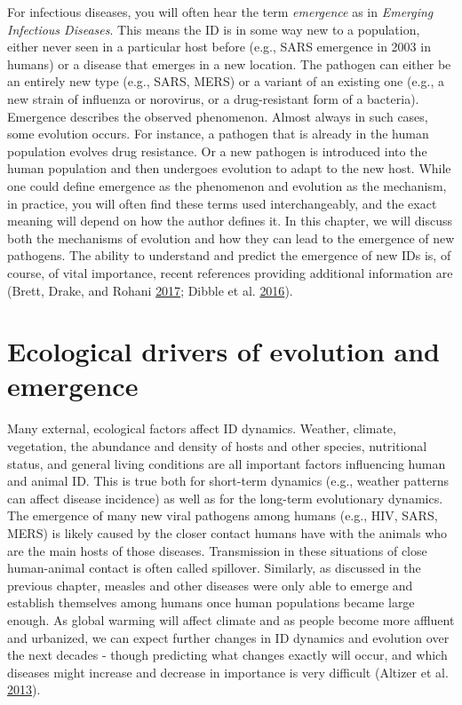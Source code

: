 \documentclass[]{book}
\theoremstyle{definition}
\theoremstyle{definition}
\theoremstyle{definition}
\theoremstyle{remark}
\begin{document}
For infectious diseases, you will often hear the term \emph{emergence}
as in \emph{Emerging Infectious Diseases}. This means the ID is in some
way new to a population, either never seen in a particular host before
(e.g., SARS emergence in 2003 in humans) or a disease that emerges in a
new location. The pathogen can either be an entirely new type (e.g.,
SARS, MERS) or a variant of an existing one (e.g., a new strain of
influenza or norovirus, or a drug-resistant form of a bacteria).
Emergence describes the observed phenomenon. Almost always in such
cases, some evolution occurs. For instance, a pathogen that is already
in the human population evolves drug resistance. Or a new pathogen is
introduced into the human population and then undergoes evolution to
adapt to the new host. While one could define emergence as the
phenomenon and evolution as the mechanism, in practice, you will often
find these terms used interchangeably, and the exact meaning will depend
on how the author defines it. In this chapter, we will discuss both the
mechanisms of evolution and how they can lead to the emergence of new
pathogens. The ability to understand and predict the emergence of new
IDs is, of course, of vital importance, recent references providing
additional information are (Brett, Drake, and Rohani
\protect\hyperlink{ref-brett17}{2017}; Dibble et al.
\protect\hyperlink{ref-dibble16}{2016}).

\section{Ecological drivers of evolution and
emergence}\label{ecological-drivers-of-evolution-and-emergence}

Many external, ecological factors affect ID dynamics. Weather, climate,
vegetation, the abundance and density of hosts and other species,
nutritional status, and general living conditions are all important
factors influencing human and animal ID. This is true both for
short-term dynamics (e.g., weather patterns can affect disease
incidence) as well as for the long-term evolutionary dynamics. The
emergence of many new viral pathogens among humans (e.g., HIV, SARS,
MERS) is likely caused by the closer contact humans have with the
animals who are the main hosts of those diseases. Transmission in these
situations of close human-animal contact is often called spillover.
Similarly, as discussed in the previous chapter, measles and other
diseases were only able to emerge and establish themselves among humans
once human populations became large enough. As global warming will
affect climate and as people become more affluent and urbanized, we can
expect further changes in ID dynamics and evolution over the next
decades - though predicting what changes exactly will occur, and which
diseases might increase and decrease in importance is very difficult
(Altizer et al. \protect\hyperlink{ref-altizer13}{2013}).
\end{document}
